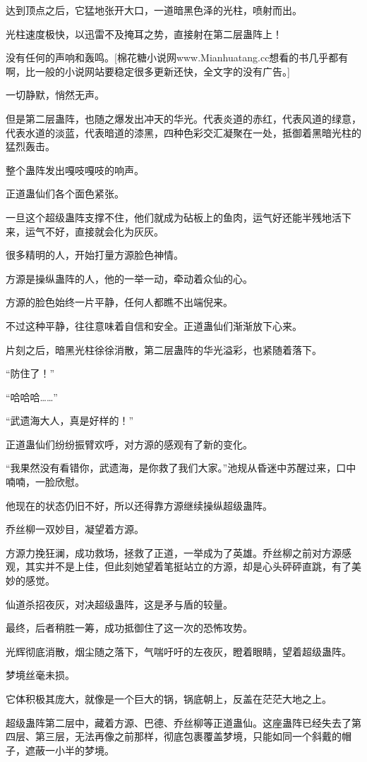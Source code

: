 \begin{this_body}
达到顶点之后，它猛地张开大口，一道暗黑色泽的光柱，喷射而出。

光柱速度极快，以迅雷不及掩耳之势，直接射在第二层蛊阵上！

没有任何的声响和轰鸣。[棉花糖小说网www.Mianhuatang.cc想看的书几乎都有啊，比一般的小说网站要稳定很多更新还快，全文字的没有广告。]

一切静默，悄然无声。

但是第二层蛊阵，也随之爆发出冲天的华光。代表炎道的赤红，代表风道的绿意，代表水道的淡蓝，代表暗道的漆黑，四种色彩交汇凝聚在一处，抵御着黑暗光柱的猛烈轰击。

整个蛊阵发出嘎吱嘎吱的响声。

正道蛊仙们各个面色紧张。

一旦这个超级蛊阵支撑不住，他们就成为砧板上的鱼肉，运气好还能半残地活下来，运气不好，直接就会化为灰灰。

很多精明的人，开始打量方源脸色神情。

方源是操纵蛊阵的人，他的一举一动，牵动着众仙的心。

方源的脸色始终一片平静，任何人都瞧不出端倪来。

不过这种平静，往往意味着自信和安全。正道蛊仙们渐渐放下心来。

片刻之后，暗黑光柱徐徐消散，第二层蛊阵的华光溢彩，也紧随着落下。

“防住了！”

“哈哈哈……”

“武遗海大人，真是好样的！”

正道蛊仙们纷纷振臂欢呼，对方源的感观有了新的变化。

“我果然没有看错你，武遗海，是你救了我们大家。”池规从昏迷中苏醒过来，口中喃喃，一脸欣慰。

他现在的状态仍旧不好，所以还得靠方源继续操纵超级蛊阵。

乔丝柳一双妙目，凝望着方源。

方源力挽狂澜，成功救场，拯救了正道，一举成为了英雄。乔丝柳之前对方源感观，其实并不是上佳，但此刻她望着笔挺站立的方源，却是心头砰砰直跳，有了美妙的感觉。

仙道杀招夜灰，对决超级蛊阵，这是矛与盾的较量。

最终，后者稍胜一筹，成功抵御住了这一次的恐怖攻势。

光辉彻底消散，烟尘随之落下，气喘吁吁的左夜灰，瞪着眼睛，望着超级蛊阵。

梦境丝毫未损。

它体积极其庞大，就像是一个巨大的锅，锅底朝上，反盖在茫茫大地之上。

超级蛊阵第二层中，藏着方源、巴德、乔丝柳等正道蛊仙。这座蛊阵已经失去了第四层、第三层，无法再像之前那样，彻底包裹覆盖梦境，只能如同一个斜戴的帽子，遮蔽一小半的梦境。


\end{this_body}
